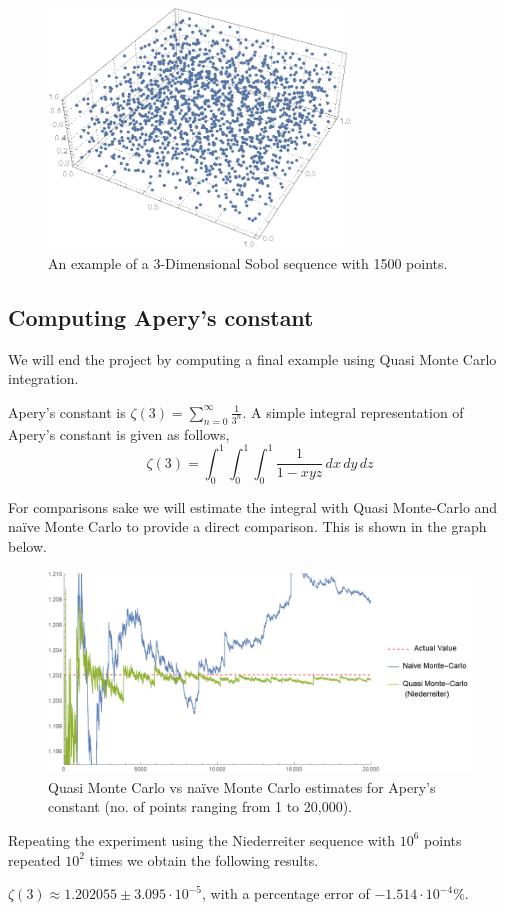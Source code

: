 \documentclass[12pt]{article}
\numberwithin{equation}{section}
\begin{document}
\begin{figure}[!htb]
    \centering
    \includegraphics[width=8cm]{Images/sobol3d.png}
    \caption{An example of a 3-Dimensional Sobol sequence with 1500 points.}
    \label{fig:3dexamplesobol}
\end{figure}
\FloatBarrier
\subsection{Computing Apery's constant}
We will end the project by computing a final example using Quasi Monte Carlo integration.\par
Apery's constant is $\zeta(3)=\sum_{n=0}^{\infty}\frac{1}{3^n}$. A simple integral representation of Apery's constant is given as follows,
\[\zeta(3)=\int_0^1\int_0^1\int_0^1 \frac{1}{1-xyz}\, dx\, dy\, dz\]
\par For comparisons sake we will estimate the integral with Quasi Monte-Carlo and naïve Monte Carlo to provide a direct comparison. This is shown in the graph below.
\begin{figure}[!htb]
    \centering
    \includegraphics[width=\textwidth]{Images/aperyquasi.png}
    \caption{Quasi Monte Carlo vs naïve Monte Carlo estimates for Apery's constant (no. of points ranging from 1 to 20,000).}
    \label{fig:aperyquasi}
\end{figure}
\par Repeating the experiment using the Niederreiter sequence with $10^6$ points repeated $10^2$ times we obtain the following results.
\par $\zeta(3)\approx 1.202055 \pm 3.095 \cdot 10^{-5}$, with a percentage error of $-1.514 \cdot 10^{-4} \%.$
\FloatBarrier


\end{document}
